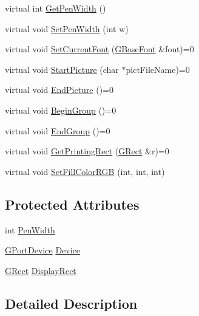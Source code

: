 \begin{DoxyCompactItemize}
\item 
virtual int \mbox{\hyperlink{class_g_base_port_aeebcbb21b90ae5614d43b0111133932e}{Get\+Pen\+Width}} ()
\item 
virtual void \mbox{\hyperlink{class_g_base_port_aa2fd1fbe050cfea5a21afb7d4cecaa61}{Set\+Pen\+Width}} (int w)
\item 
virtual void \mbox{\hyperlink{class_g_base_port_af297609a9f7ed9d29d77072037888f5e}{Set\+Current\+Font}} (\mbox{\hyperlink{class_g_base_font}{G\+Base\+Font}} \&font)=0
\item 
virtual void \mbox{\hyperlink{class_g_base_port_aad9e21ed63c4f04a508e30b7f100fba5}{Start\+Picture}} (char $\ast$pict\+File\+Name)=0
\item 
virtual void \mbox{\hyperlink{class_g_base_port_ac14e5cf72682662f8ac24c57e98b1bfa}{End\+Picture}} ()=0
\item 
virtual void \mbox{\hyperlink{class_g_base_port_ac7aafbb728fe8b61dec2c3f163e2c894}{Begin\+Group}} ()=0
\item 
virtual void \mbox{\hyperlink{class_g_base_port_aa5b444d85d6bf8c88bbddb58f7ce8bd4}{End\+Group}} ()=0
\item 
virtual void \mbox{\hyperlink{class_g_base_port_af2e9e7d8adf001df68ab3e714dd4242e}{Get\+Printing\+Rect}} (\mbox{\hyperlink{class_g_rect}{G\+Rect}} \&r)=0
\item 
virtual void \mbox{\hyperlink{class_g_base_port_af13ac2220d4ff90a160294c79d4a2c1b}{Set\+Fill\+Color\+R\+GB}} (int, int, int)
\end{DoxyCompactItemize}
\subsection*{Protected Attributes}
\begin{DoxyCompactItemize}
\item 
int \mbox{\hyperlink{class_g_base_port_a9a76c3a8af8d0e9f29035d02d8f038c1}{Pen\+Width}}
\item 
\mbox{\hyperlink{gport_8h_a595e501a3b83fde14c760260fbfb153f}{G\+Port\+Device}} \mbox{\hyperlink{class_g_base_port_a14275a027c8665d5fa4941e148a1b46a}{Device}}
\item 
\mbox{\hyperlink{class_g_rect}{G\+Rect}} \mbox{\hyperlink{class_g_base_port_ac0e1180ebadeed5d3c7d0291db1bdf29}{Display\+Rect}}
\end{DoxyCompactItemize}


\subsection{Detailed Description}


